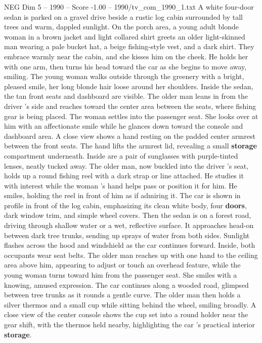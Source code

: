 \begin{textsample}{NEG Dim 5 – 1990 – Score -1.00 – 1990/tv\_com\_1990\_1.txt}  \label{ex:f5_neg_084}
A white four-door sedan is parked on a gravel drive beside a rustic log cabin surrounded by tall trees and warm, dappled sunlight.
On the porch area, a young adult blonde woman in a brown jacket and light collared shirt greets an older light-skinned man wearing a pale bucket hat, a beige fishing-style vest, and a dark shirt.
They embrace warmly near the cabin, and she kisses him on the cheek.
He holds her with one arm, then turns his head toward the car as she begins to move away, smiling.
The young woman walks outside through the greenery with a bright, pleased smile, her long blonde hair loose around her shoulders.
Inside the sedan, the tan front seats and dashboard are visible.
The older man leans in from the driver ’s side and reaches toward the center area between the seats, where fishing gear is being placed.
The woman settles into the passenger seat.
She looks over at him with an affectionate smile while he glances down toward the console and dashboard area.
A close view shows a hand resting on the padded center armrest between the front seats.
The hand lifts the armrest lid, revealing a small \textbf{storage} compartment underneath.
Inside are a pair of sunglasses with purple-tinted lenses, neatly tucked away.
The older man, now buckled into the driver ’s seat, holds up a round fishing reel with a dark strap or line attached.
He studies it with interest while the woman ’s hand helps pass or position it for him.
He smiles, holding the reel in front of him as if admiring it.
The car is shown in profile in front of the log cabin, emphasizing its clean white body, four \textbf{doors}, dark window trim, and simple wheel covers.
Then the sedan is on a forest road, driving through shallow water or a wet, reflective surface.
It approaches head-on between dark tree trunks, sending up sprays of water from both sides.
Sunlight flashes across the hood and windshield as the car continues forward.
Inside, both occupants wear seat belts.
The older man reaches up with one hand to the ceiling area above him, appearing to adjust or touch an overhead feature, while the young woman turns toward him from the passenger seat.
She smiles with a knowing, amused expression.
The car continues along a wooded road, glimpsed between tree trunks as it rounds a gentle curve.
The older man then holds a silver thermos and a small cup while sitting behind the wheel, smiling broadly.
A close view of the center console shows the cup set into a round holder near the gear shift, with the thermos held nearby, highlighting the car ’s practical interior \textbf{storage}.

\end{textsample}
